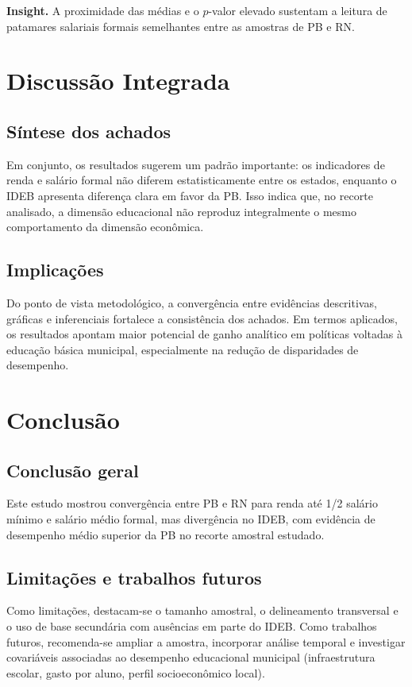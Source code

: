 \documentclass[10pt, a4paper, twocolumn]{article}
\begin{document}
\textbf{Insight.} A proximidade das médias e o $p$-valor elevado sustentam a leitura de patamares salariais formais semelhantes entre as amostras de PB e RN.

\FloatBarrier

\section{Discussão Integrada}
\subsection{Síntese dos achados}
Em conjunto, os resultados sugerem um padrão importante: os indicadores de renda e salário formal não diferem estatisticamente entre os estados, enquanto o IDEB apresenta diferença clara em favor da PB. Isso indica que, no recorte analisado, a dimensão educacional não reproduz integralmente o mesmo comportamento da dimensão econômica.

\subsection{Implicações}
Do ponto de vista metodológico, a convergência entre evidências descritivas, gráficas e inferenciais fortalece a consistência dos achados. Em termos aplicados, os resultados apontam maior potencial de ganho analítico em políticas voltadas à educação básica municipal, especialmente na redução de disparidades de desempenho.

\section{Conclusão}
\subsection{Conclusão geral}
Este estudo mostrou convergência entre PB e RN para renda até 1/2 salário mínimo e salário médio formal, mas divergência no IDEB, com evidência de desempenho médio superior da PB no recorte amostral estudado.

\subsection{Limitações e trabalhos futuros}
Como limitações, destacam-se o tamanho amostral, o delineamento transversal e o uso de base secundária com ausências em parte do IDEB. Como trabalhos futuros, recomenda-se ampliar a amostra, incorporar análise temporal e investigar covariáveis associadas ao desempenho educacional municipal (infraestrutura escolar, gasto por aluno, perfil socioeconômico local).
\end{document}
